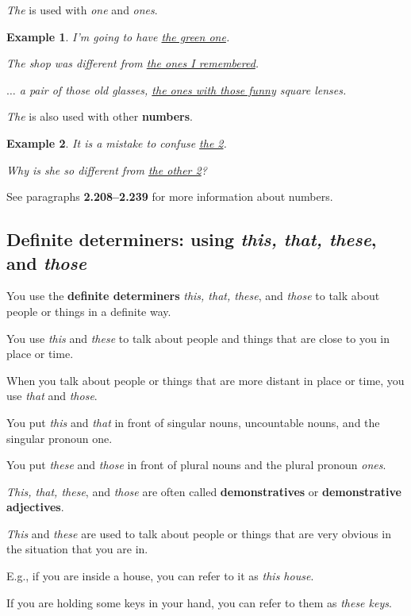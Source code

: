 \documentclass[oneside]{book}
\numberwithin{equation}{section}
\newtheorem{example}{Example}[section]
\begin{document}
%
\noindent{} \textit{The} is used with \textit{one} and \textit{ones}.
\begin{example}
    I'm going to have \underline{the green one}.
    
    The shop was different from \underline{the ones I remembered}.
    
    $\ldots$ a pair of those old glasses, \underline{the ones with those funny} square lenses.
\end{example}
\textit{The} is also used with other \textbf{numbers}.
\begin{example}
    It is a mistake to confuse \underline{the 2}.
    
    Why is she so different from \underline{the other 2}?
\end{example}
See paragraphs \textbf{2.208--2.239} for more information about numbers.

\subsection{Definite determiners: using \textit{this, that, these}, and \textit{those}}
\noindent{} You use the \textbf{definite determiners} \textit{this, that, these}, and \textit{those} to talk about people or things in a definite way.

%
You use \textit{this} and \textit{these} to talk about people and things that are close to you in place or time.

When you talk about people or things that are more distant in place or time, you use \textit{that} and \textit{those}.

%
You put \textit{this} and \textit{that} in front of singular nouns, uncountable nouns, and the singular pronoun one.

You put \textit{these} and \textit{those} in front of plural nouns and the plural pronoun \textit{ones}.

%
\textit{This, that, these}, and \textit{those} are often called \textbf{demonstratives} or \textbf{demonstrative adjectives}.

%
\noindent{} \textit{This} and \textit{these} are used to talk about people or things that are very obvious in the situation that you are in.

E.g., if you are inside a house, you can refer to it as \textit{this house}.

If you are holding some keys in your hand, you can refer to them as \textit{these keys}.
\end{document}
